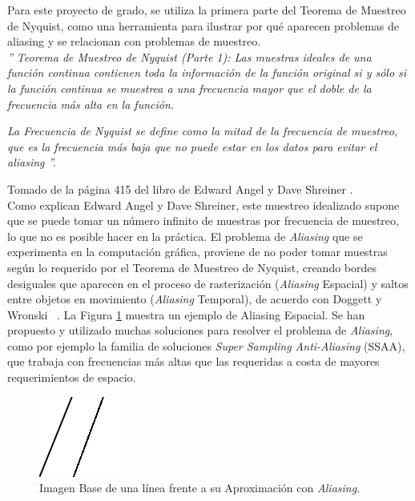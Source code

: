 \documentclass[pregrado]{tesis-usb} %
\begin{document}
Para este proyecto de grado, se utiliza la primera parte del Teorema de Muestreo de Nyquist, como una herramienta para ilustrar por qué aparecen problemas de aliasing y se relacionan con problemas de muestreo.  \\

\emph{'' Teorema de Muestreo de Nyquist (Parte 1): Las muestras ideales de una función continua contienen toda la información de la función original si y sólo si la función continua se muestrea a una frecuencia mayor que el doble de la frecuencia más alta en la función. }

\emph{La Frecuencia de Nyquist se define como la mitad de la frecuencia de muestreo, que es la frecuencia más baja que no puede estar en los datos para evitar el \textit{aliasing} ''.
} 


Tomado de la página 415 del libro de Edward Angel y Dave Shreiner \cite{Shreiner2011}.  \\

Como explican Edward Angel y Dave Shreiner, este muestreo idealizado supone que se puede tomar un número infinito de muestras por frecuencia de muestreo, lo que no es posible hacer en la práctica. El problema de \textit{Aliasing} que se experimenta en la computación gráfica, proviene de no poder tomar muestras según lo requerido por el Teorema de Muestreo de Nyquist, creando bordes desiguales que aparecen en el proceso de rasterización (\textit{Aliasing} Espacial) y saltos entre objetos en movimiento (\textit{Aliasing} Temporal), de acuerdo con Doggett y Wronski ~\cite{Doggett2017EDAN35, Wronski2014}. La Figura \ref{fig:aliasingexample} muestra un ejemplo de Aliasing Espacial. Se han propuesto y utilizado muchas soluciones para resolver el problema de \textit{Aliasing}, como por ejemplo la familia de soluciones \textit{Super Sampling Anti-Aliasing} (SSAA), que trabaja con frecuencias más altas que las requeridas a costa de mayores requerimientos de espacio.

\begin{figure}[!hbt]
	\centering
	\includegraphics[scale=0.6]{images/aliasing_example.png} 
	\caption{Imagen Base de una línea frente a su Aproximación con \textit{Aliasing}.}\label{fig:aliasingexample}
\end{figure}
\end{document}
